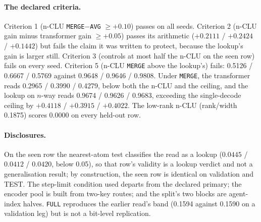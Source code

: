 \documentclass{article} %
\begin{document}
\paragraph{The declared criteria.} Criterion 1 (n-CLU \texttt{MERGE}$-$\texttt{AVG} $\ge+0.10$) passes on all seeds.
Criterion 2 (n-CLU gain minus transformer gain $\ge+0.05$) passes its arithmetic ($+0.2111$ / $+0.2424$
/ $+0.1442$) but fails the claim it was written to protect, because the lookup's gain is larger
still. Criterion 3 (controls at most half the n-CLU on the seen row) fails on every seed. Criterion 5 (n-CLU
\texttt{MERGE} above the lookup's) fails: 0.5126 / 0.6667 / 0.5769 against 0.9648 / 0.9646 /
0.9808. Under \texttt{MERGE}, the transformer reads 0.2965 / 0.3990 / 0.4279, below both the n-CLU
and the ceiling, and the lookup on $n$-way reads 0.9674 / 0.9626 / 0.9683, exceeding the
single-decode ceiling by $+0.4118$ / $+0.3915$ / $+0.4022$. The low-rank n-CLU
(rank/width 0.1875) scores 0.0000 on every held-out row. %

\paragraph{Disclosures.} On the seen row the nearest-atom test classifies the read as a lookup
($0.0445$ / $0.0412$ / $0.0420$, below 0.05), so that row's validity is a lookup verdict and not a
generalisation result; by construction, the seen row is identical on validation and TEST. The
step-limit condition used departs from the declared primary; the encoder pool is built
from two-key routes; and the split's two blocks are agent-index halves. \texttt{FULL} reproduces
the earlier read's band (0.1594 against 0.1590 on a validation leg) but is not a bit-level
replication. %
\end{document}
